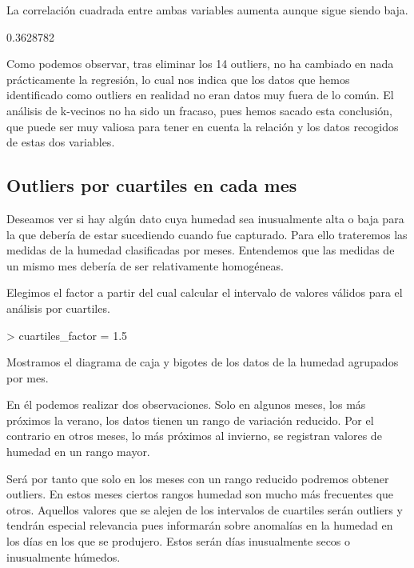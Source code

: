 \documentclass [a4paper] {article}
\begin{document}
La correlación cuadrada entre ambas variables aumenta aunque sigue siendo baja.
\begin{Schunk}
\begin{Soutput}
[1] 0.3628782
\end{Soutput}
\end{Schunk}

Como podemos observar, tras eliminar los 14 outliers, no ha cambiado en nada prácticamente la regresión, lo cual nos indica que los datos que hemos 
identificado como outliers en realidad no eran datos muy fuera de lo común. El análisis de k-vecinos no ha sido un fracaso, pues hemos sacado esta 
conclusión, que puede ser muy valiosa para tener en cuenta la relación y los datos recogidos de estas dos variables.


\newpage
\subsection{Outliers por cuartiles en cada mes}

Deseamos ver si hay algún dato cuya humedad sea inusualmente alta o baja para la que debería de estar sucediendo cuando fue capturado.
Para ello trateremos las medidas de la humedad clasificadas por meses.
Entendemos que las medidas de un mismo mes debería de ser relativamente homogéneas.

Elegimos el factor a partir del cual calcular el intervalo de valores válidos para el análisis por cuartiles.
\begin{Schunk}
\begin{Sinput}
> cuartiles_factor = 1.5
\end{Sinput}
\end{Schunk}

Mostramos el diagrama de caja y bigotes de los datos de la humedad agrupados por mes.

En él podemos realizar dos observaciones.
Solo en algunos meses, los más próximos la verano, los datos tienen un rango de variación reducido.
Por el contrario en otros meses, lo más próximos al invierno, se registran valores de humedad en un rango mayor.

Será por tanto que solo en los meses con un rango reducido podremos obtener outliers.
En estos meses ciertos rangos humedad son mucho más frecuentes que otros.
Aquellos valores que se alejen de los intervalos de cuartiles serán outliers y tendrán especial relevancia pues informarán sobre anomalías en la humedad en los días en los que se produjero.
Estos serán días inusualmente secos o inusualmente húmedos.
\end{document}

